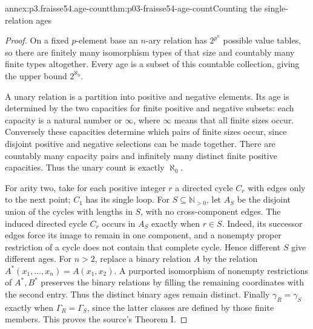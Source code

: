 \begin{annexitem}{annex:p3.fraisse54.age-count}{thm:p03-fraisse54-age-count}{Counting the single-relation ages}
\begin{proof}
On a fixed \(p\)-element base an \(n\)-ary relation has
\(2^{p^n}\) possible value tables, so there are finitely many isomorphism
types of that size and countably many finite types altogether. Every age is
a subset of this countable collection, giving the upper bound
\(2^{\aleph_0}\).

A unary relation is a partition into positive and negative elements. Its
age is determined by the two capacities for finite positive and negative
subsets: each capacity is a natural number or \(\infty\), where
\(\infty\) means that all finite sizes occur. Conversely these capacities
determine which pairs of finite sizes occur, since disjoint positive and
negative selections can be made together. There are countably many capacity
pairs and infinitely many distinct finite positive capacities. Thus the unary
count is exactly \(\aleph_0\).

For arity two, take for each positive integer \(r\) a directed cycle
\(C_r\) with edges only to the next point; \(C_1\) has its single loop.
For \(S\subseteq\mathbb N_{>0}\), let \(A_S\) be the disjoint union of
the cycles with lengths in \(S\), with no cross-component edges. The
induced directed cycle \(C_r\) occurs in \(A_S\) exactly when \(r\in S\).
Indeed, its successor edges force its image to remain in one component,
and a nonempty proper restriction of a cycle does not contain that complete
cycle. Hence different \(S\) give different ages. For \(n>2\), replace
a binary relation \(A\) by the relation
\(A^*(x_1,\ldots,x_n)=A(x_1,x_2)\). A purported isomorphism of nonempty
restrictions of \(A^*,B^*\) preserves the binary relations by filling the
remaining coordinates with the second entry. Thus the distinct binary ages
remain distinct. Finally \(\gamma_R=\gamma_S\) exactly when
\(\Gamma_R=\Gamma_S\), since the latter classes are defined by those
finite members. This proves the source's Theorem I.
\end{proof}
\end{annexitem}

